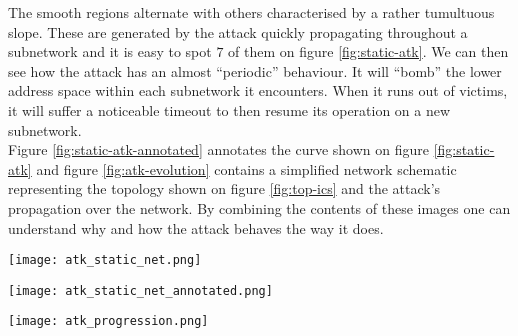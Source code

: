             The smooth regions alternate with others characterised by a rather tumultuous slope. These are generated by the attack quickly propagating throughout a subnetwork and it is easy to spot $7$ of them on figure \ref{fig:static-atk}. We can then see how the attack has an almost ``periodic'' behaviour. It will ``bomb'' the lower address space within each subnetwork it encounters. When it runs out of victims, it will suffer a noticeable timeout to then resume its operation on a new subnetwork.\\

            Figure \ref{fig:static-atk-annotated} annotates the curve shown on figure \ref{fig:static-atk} and figure \ref{fig:atk-evolution} contains a simplified network schematic representing the topology shown on figure \ref{fig:top-ics} and the attack's propagation over the network. By combining the contents of these images one can understand why and how the attack behaves the way it does.\\

            \begin{sidewaysfigure}
                \centering
                \texttt{[image: atk\_static\_net.png]}
                \caption[\textit{QoS} on a Static Topology]{Evolution of the \textit{QoS} Over Time for a Static Topology.}
                \label{fig:static-atk}
            \end{sidewaysfigure}

            \begin{sidewaysfigure}
                \centering
                \texttt{[image: atk\_static\_net\_annotated.png]}
                \caption[Annotated \textit{QoS} on a Static Topology]{Annotated Evolution of the \textit{QoS} Over Time for a Static Topology.}
                \label{fig:static-atk-annotated}
            \end{sidewaysfigure}

            \begin{sidewaysfigure}
                \centering
                \texttt{[image: atk\_progression.png]}
                \caption[Attack Progression]{Attack Progression Over the Network.}
                \label{fig:atk-progression}
            \end{sidewaysfigure}

            

